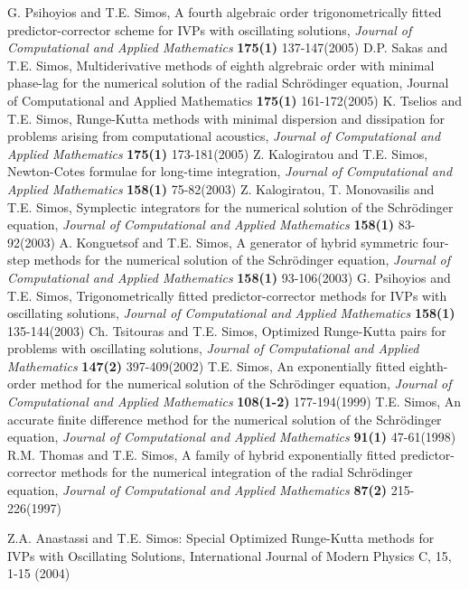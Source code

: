 \documentclass[numreferences]{kluwer}
\begin{document}
\begin{article}
\begin{thebibliography}{120}
 G. Psihoyios and T.E. Simos, A fourth algebraic order trigonometrically fitted predictor-corrector scheme for IVPs with
oscillating solutions, {\it Journal of Computational and Applied
Mathematics} {\bf 175(1)} 137-147(2005)
 D.P. Sakas and T.E. Simos, Multiderivative methods of eighth algrebraic order with minimal phase-lag for the numerical solution of
the radial Schr\"odinger equation,  Journal of Computational and
Applied Mathematics   {\bf 175(1)} 161-172(2005)
 K. Tselios and T.E. Simos, Runge-Kutta methods with minimal dispersion and dissipation for problems arising from computational acoustics, {\it Journal of Computational and Applied Mathematics} {\bf 175(1)} 173-181(2005)
 Z. Kalogiratou and T.E. Simos, Newton-Cotes formulae for long-time integration, {\it Journal of Computational and Applied Mathematics} {\bf 158(1)} 75-82(2003)
 Z. Kalogiratou, T. Monovasilis and T.E. Simos, Symplectic integrators for the numerical solution of the Schr\"odinger equation, {\it Journal of Computational and Applied Mathematics} {\bf 158(1)} 83-92(2003)
  A. Konguetsof and T.E. Simos, A generator of hybrid symmetric four-step methods for the numerical solution of the Schr\"odinger equation, {\it Journal of Computational and Applied Mathematics} {\bf 158(1)}  93-106(2003)
 G. Psihoyios and T.E. Simos, Trigonometrically fitted predictor-corrector methods for IVPs with oscillating solutions, {\it Journal of Computational and Applied Mathematics} {\bf 158(1)} 135-144(2003)
 Ch. Tsitouras and T.E. Simos, Optimized Runge-Kutta pairs for problems with oscillating solutions, {\it Journal of Computational and Applied Mathematics} {\bf 147(2)} 397-409(2002)
 T.E. Simos, An exponentially fitted eighth-order method for the numerical solution of the Schr\"odinger equation, {\it Journal of Computational and Applied Mathematics} {\bf 108(1-2)}
177-194(1999)
 T.E. Simos, An accurate finite difference method for the numerical solution of the Schr\"odinger equation, {\it Journal of Computational and Applied Mathematics} {\bf 91(1)} 47-61(1998)
 R.M. Thomas and T.E. Simos, A family of hybrid exponentially fitted predictor-corrector methods for the
numerical integration of the radial Schr\"odinger equation, {\it
Journal of Computational and Applied Mathematics} {\bf 87(2)}
215-226(1997)

 Z.A. Anastassi and T.E. Simos: Special Optimized Runge-Kutta methods for IVPs with Oscillating Solutions, International Journal of Modern Physics C, 15, 1-15 (2004)


\end{thebibliography}
\end{article}
\end{document}
